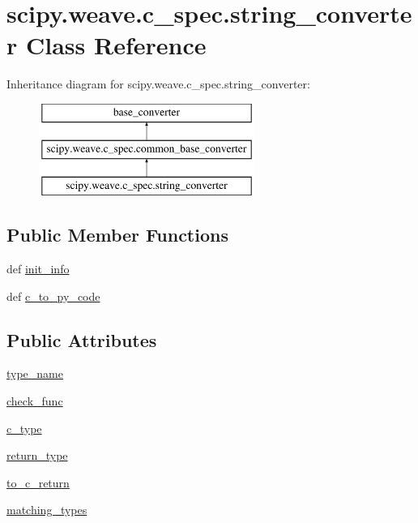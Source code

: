\hypertarget{classscipy_1_1weave_1_1c__spec_1_1string__converter}{}\section{scipy.\+weave.\+c\+\_\+spec.\+string\+\_\+converter Class Reference}
\label{classscipy_1_1weave_1_1c__spec_1_1string__converter}
Inheritance diagram for scipy.\+weave.\+c\+\_\+spec.\+string\+\_\+converter\+:\begin{figure}[H]
\begin{center}
\leavevmode
\includegraphics[height=3.000000cm]{classscipy_1_1weave_1_1c__spec_1_1string__converter}
\end{center}
\end{figure}
\subsection*{Public Member Functions}
\begin{DoxyCompactItemize}
\item 
def \hyperlink{classscipy_1_1weave_1_1c__spec_1_1string__converter_ae27ae1d1da184d6bae1381f6bf2f7275}{init\+\_\+info}
\item 
def \hyperlink{classscipy_1_1weave_1_1c__spec_1_1string__converter_a033b383ff325c949fa897e320101974c}{c\+\_\+to\+\_\+py\+\_\+code}
\end{DoxyCompactItemize}
\subsection*{Public Attributes}
\begin{DoxyCompactItemize}
\item 
\hyperlink{classscipy_1_1weave_1_1c__spec_1_1string__converter_af9c0b23859ee9f9152db3b58e2cdd0bb}{type\+\_\+name}
\item 
\hyperlink{classscipy_1_1weave_1_1c__spec_1_1string__converter_a7e516d01ac6d0f3e98f64dff9d6dadd8}{check\+\_\+func}
\item 
\hyperlink{classscipy_1_1weave_1_1c__spec_1_1string__converter_a86ad98335fa0f79e4de6189f73a3c3a9}{c\+\_\+type}
\item 
\hyperlink{classscipy_1_1weave_1_1c__spec_1_1string__converter_ad44e40b0e976bed6dedf290d2b3ad59b}{return\+\_\+type}
\item 
\hyperlink{classscipy_1_1weave_1_1c__spec_1_1string__converter_ae9a539d0b42accf82f25995428a672ee}{to\+\_\+c\+\_\+return}
\item 
\hyperlink{classscipy_1_1weave_1_1c__spec_1_1string__converter_a823303c62ae4d93ead2dcc3df3ccc779}{matching\+\_\+types}
\end{DoxyCompactItemize}


